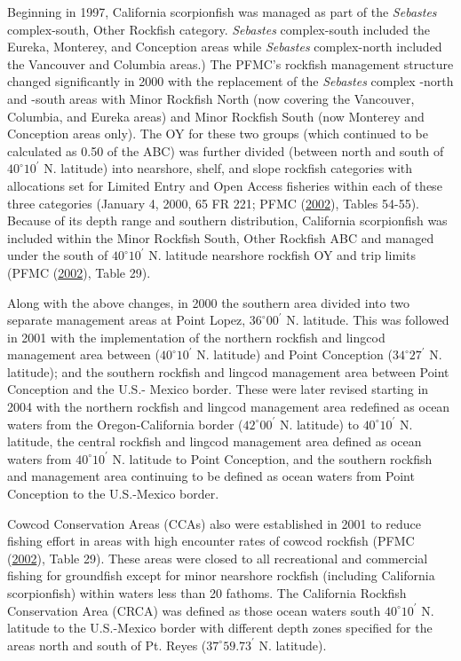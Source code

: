 \documentclass[12pt,]{article}
\begin{document}
Beginning in 1997, California scorpionfish was managed as part of the
\emph{Sebastes} complex-south, Other Rockfish category. \emph{Sebastes}
complex-south included the Eureka, Monterey, and Conception areas while
\emph{Sebastes} complex-north included the Vancouver and Columbia
areas.) The PFMC's rockfish management structure changed significantly
in 2000 with the replacement of the \emph{Sebastes} complex -north and
-south areas with Minor Rockfish North (now covering the Vancouver,
Columbia, and Eureka areas) and Minor Rockfish South (now Monterey and
Conception areas only). The OY for these two groups (which continued to
be calculated as 0.50 of the ABC) was further divided (between north and
south of \(40^\circ 10^\prime\) N. latitude) into nearshore, shelf, and
slope rockfish categories with allocations set for Limited Entry and
Open Access fisheries within each of these three categories (January 4,
2000, 65 FR 221; PFMC (\protect\hyperlink{ref-PFMC2002}{2002}), Tables
54-55). Because of its depth range and southern distribution, California
scorpionfish was included within the Minor Rockfish South, Other
Rockfish ABC and managed under the south of \(40^\circ 10^\prime\) N.
latitude nearshore rockfish OY and trip limits (PFMC
(\protect\hyperlink{ref-PFMC2002}{2002}), Table 29).

Along with the above changes, in 2000 the southern area divided into two
separate management areas at Point Lopez, \(36^\circ 00^\prime\) N.
latitude. This was followed in 2001 with the implementation of the
northern rockfish and lingcod management area between
(\(40^\circ 10^\prime\) N. latitude) and Point Conception
(\(34^\circ 27^\prime\) N. latitude); and the southern rockfish and
lingcod management area between Point Conception and the U.S.- Mexico
border. These were later revised starting in 2004 with the northern
rockfish and lingcod management area redefined as ocean waters from the
Oregon-California border (\(42^\circ 00^\prime\) N. latitude) to
\(40^\circ 10^\prime\) N. latitude, the central rockfish and lingcod
management area defined as ocean waters from \(40^\circ 10^\prime\) N.
latitude to Point Conception, and the southern rockfish and management
area continuing to be defined as ocean waters from Point Conception to
the U.S.-Mexico border.

Cowcod Conservation Areas (CCAs) also were established in 2001 to reduce
fishing effort in areas with high encounter rates of cowcod rockfish
(PFMC (\protect\hyperlink{ref-PFMC2002}{2002}), Table 29). These areas
were closed to all recreational and commercial fishing for groundfish
except for minor nearshore rockfish (including California scorpionfish)
within waters less than 20 fathoms. The California Rockfish Conservation
Area (CRCA) was defined as those ocean waters south
\(40^\circ 10^\prime\) N. latitude to the U.S.-Mexico border with
different depth zones specified for the areas north and south of Pt.
Reyes (\(37^\circ 59.73^\prime\) N. latitude).
\end{document}
